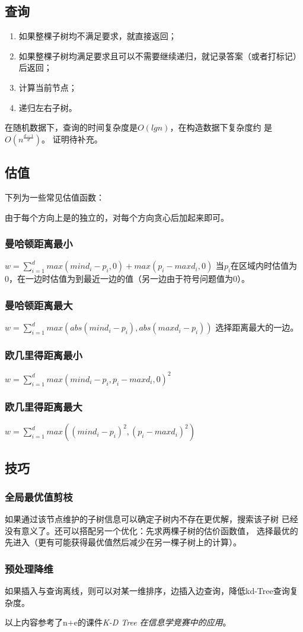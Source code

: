 \subsection{查询}
\begin{enumerate}
	\item 如果整棵子树均不满足要求，就直接返回；
	\item 如果整棵子树均满足要求且可以不需要继续递归，就记录答案（或者打标记）后返回；
	\item 计算当前节点；
	\item 递归左右子树。
\end{enumerate}
在随机数据下，查询的时间复杂度是$O(lgn)$，在构造数据下复杂度约
是$O(n^\frac{d-1}{d})$。
证明待补充。
\subsection{估值}
下列为一些常见估值函数：

由于每个方向上是的独立的，对每个方向贪心后加起来即可。
\subsubsection{曼哈顿距离最小}
$w=\sum_{i=1}^d{max(mind_i-p_i,0)+max(p_i-maxd_i,0)}$
当$p_i$在区域内时估值为0，在一边时估值为到最近一边的值（另一边由于符号问题值为0）。
\subsubsection{曼哈顿距离最大}
$w=\sum_{i=1}^d{max(abs(mind_i-p_i),abs(maxd_i-p_i))}$
选择距离最大的一边。
\subsubsection{欧几里得距离最小}
$w=\sum_{i=1}^d{max(mind_i-p_i,p_i-maxd_i,0)^2}$
\subsubsection{欧几里得距离最大}
$w=\sum_{i=1}^d{max((mind_i-p_i)^2,(p_i-maxd_i)^2)}$
\subsection{技巧}
\subsubsection{全局最优值剪枝}
如果通过该节点维护的子树信息可以确定子树内不存在更优解，搜索该子树
已经没有意义了。还可以搭配另一个优化：先求两棵子树的估价函数值，
选择最优的先进入（更有可能获得最优值然后减少在另一棵子树上的计算）。
\subsubsection{预处理降维}
如果插入与查询离线，则可以对某一维排序，边插入边查询，降低kd-Tree查询复杂度。

以上内容参考了n+e的课件\emph{K-D Tree 在信息学竞赛中的应用}\cite{kdTree}。
